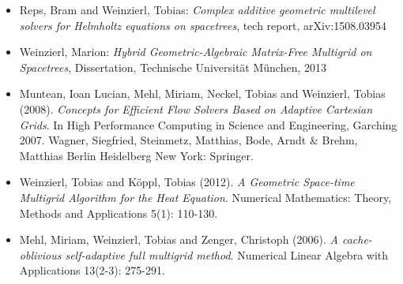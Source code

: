 \begin{itemize}
  \item  Reps, Bram and Weinzierl, Tobias: {\em Complex additive geometric
  multilevel solvers for Helmholtz equations on spacetrees}, tech report,  
  arXiv:1508.03954
  \item Weinzierl, Marion: {\em Hybrid Geometric-Algebraic Matrix-Free Multigrid on
Spacetrees}, Dissertation, Technische Universit\"at M\"unchen, 2013
  \item   Muntean, Ioan Lucian, Mehl, Miriam, Neckel, Tobias and Weinzierl,
  Tobias (2008). {\em Concepts for Efficient Flow Solvers Based on Adaptive
  Cartesian Grids}. In High Performance Computing in Science and Engineering, Garching 2007. Wagner, Siegfried, Steinmetz, Matthias, Bode, Arndt & Brehm, Matthias Berlin Heidelberg New York: Springer.
  \item Weinzierl, Tobias and K\"oppl, Tobias (2012). {\em A Geometric
  Space-time Multigrid Algorithm for the Heat Equation}. Numerical Mathematics:
  Theory, Methods and Applications 5(1): 110-130.
  \item Mehl, Miriam, Weinzierl, Tobias and Zenger, Christoph (2006). {\em A
  cache-oblivious self-adaptive full multigrid method}. Numerical Linear Algebra
  with Applications 13(2-3): 275-291.
\end{itemize}
